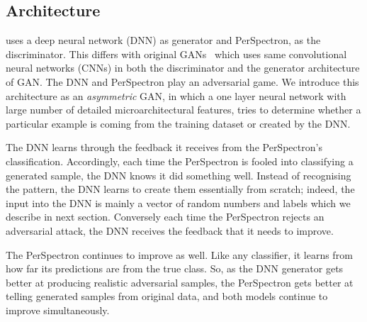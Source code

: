 \begin{note}

\end{note}
 

\subsection{{\scheme} Architecture}

{\scheme} uses a deep neural network (DNN) as generator and PerSpectron,  as the discriminator. This differs with original  GANs~\cite{goodfellow2014generative} which uses same convolutional neural
networks (CNNs) in both the discriminator and the generator
architecture of GAN.  The DNN and PerSpectron play an
adversarial game. We introduce this architecture as an {\em asymmetric} GAN, in which a one layer neural network with large number of detailed microarchitectural features, tries to determine whether a particular example is coming from the training dataset or created by the DNN. 

The DNN learns through the feedback it receives from the PerSpectron's classification. 
 Accordingly, each time the PerSpectron is fooled into classifying a generated sample, the DNN knows it did something well. Instead of recognising the pattern, the DNN learns to create them essentially from scratch; indeed, the input into the DNN is mainly a vector of random numbers and labels which we describe in next section.  Conversely each time the PerSpectron  rejects an adversarial attack, the DNN receives the feedback that it needs to improve.

The PerSpectron continues to improve as well. Like any classifier, it learns from how far its predictions are from the true class. 
So, as the DNN generator gets better at producing realistic adversarial samples, the PerSpectron gets better at telling generated samples from original data, and both models continue to improve simultaneously. 







